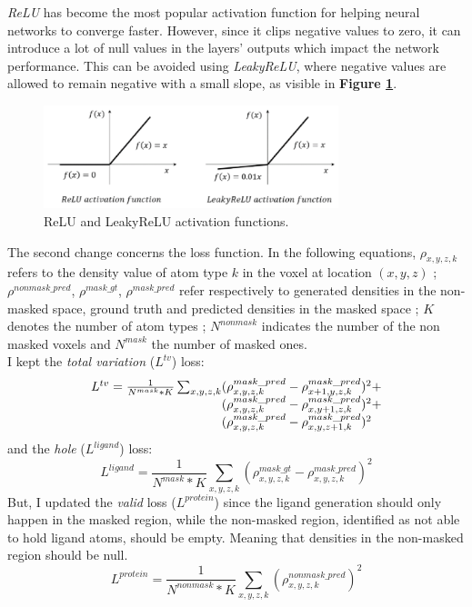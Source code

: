 \documentclass{article}
\begin{document}
\textit{ReLU} has become the most popular activation function for helping neural networks to converge faster. However, since it clips negative values to zero, it can introduce a lot of null values in the layers' outputs which impact the network performance. This can be avoided using \textit{LeakyReLU}, where negative values are allowed to remain negative with a small slope, as visible in \textbf{Figure \ref{fig:l_relu}}.
\begin{figure}[H]
    \centering
    \includegraphics[height=3cm,width=\textwidth,keepaspectratio]{l_relu.png}
    \caption{ReLU and LeakyReLU activation functions.}
    \label{fig:l_relu}
\end{figure}
The second change concerns the loss function. In the following equations, $\rho_{x,y,z,k}$ refers to the density value of atom type $k$ in the voxel at location $(x,y,z)$ ; $\rho^{nonmask\_pred}$, $\rho^{mask\_gt}$, $\rho^{mask\_pred}$ refer respectively to generated densities in the non-masked space, ground truth and predicted densities in the masked space ; $K$ denotes the number of atom types ; $N^{nonmask}$ indicates the number of the non masked voxels and $N^{mask}$ the number of masked ones. \\
I kept the \textit{total variation} ($L^{tv}$) loss:
$$
\begin{array}{l@{}l}
    L^{tv} = \frac{1}{N^{mask}*K} \sum_{x,y,z,k}
    &{} (\rho_{x,y,z,k}^{mask\_pred} - \rho_{x+1,y,z,k}^{mask\_pred})^2 + \\
    &{} (\rho_{x,y,z,k}^{mask\_pred} - \rho_{x,y+1,z,k}^{mask\_pred})^2 + \\
    &{} (\rho_{x,y,z,k}^{mask\_pred} - \rho_{x,y,z+1,k}^{mask\_pred})^2
\end{array}
$$
and the \textit{hole} ($L^{ligand}$) loss:
$$
L^{ligand} = \frac{1}{N^{mask}*K} \sum_{x,y,z,k} (\rho_{x,y,z,k}^{mask\_gt} - \rho_{x,y,z,k}^{mask\_pred})^2
$$
But, I updated the \textit{valid} loss ($L^{protein}$) since the ligand generation should only happen in the masked region, while the non-masked region, identified as not able to hold ligand atoms, should be empty. Meaning that densities in the non-masked region should be null.
$$
L^{protein} = \frac{1}{N^{nonmask}*K} \sum_{x,y,z,k} (\rho_{x,y,z,k}^{nonmask\_pred})^2
$$
\end{document}
